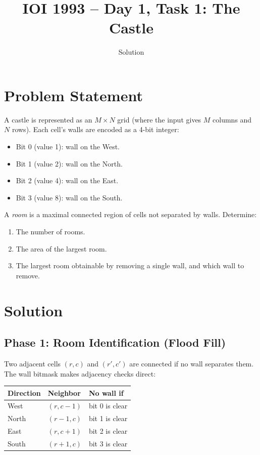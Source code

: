 \documentclass[11pt,a4paper]{article}
\title{IOI 1993 -- Day 1, Task 1: The Castle}
\author{Solution}
\date{}
\begin{document}
\maketitle

\section{Problem Statement}

A castle is represented as an $M \times N$ grid (where the input gives $M$
columns and $N$ rows). Each cell's walls are encoded as a 4-bit integer:
\begin{itemize}
  \item Bit 0 (value 1): wall on the West.
  \item Bit 1 (value 2): wall on the North.
  \item Bit 2 (value 4): wall on the East.
  \item Bit 3 (value 8): wall on the South.
\end{itemize}

A \emph{room} is a maximal connected region of cells not separated by walls.
Determine:
\begin{enumerate}
  \item The number of rooms.
  \item The area of the largest room.
  \item The largest room obtainable by removing a single wall, and which
    wall to remove.
\end{enumerate}

\section{Solution}

\subsection{Phase 1: Room Identification (Flood Fill)}

Two adjacent cells $(r, c)$ and $(r', c')$ are connected if no wall
separates them. The wall bitmask makes adjacency checks direct:

\begin{center}
\begin{tabular}{lll}
Direction & Neighbor & No wall if \\
\hline
West  & $(r, c-1)$ & bit 0 is clear \\
North & $(r-1, c)$ & bit 1 is clear \\
East  & $(r, c+1)$ & bit 2 is clear \\
South & $(r+1, c)$ & bit 3 is clear \\
\end{tabular}
\end{center}
\end{document}
